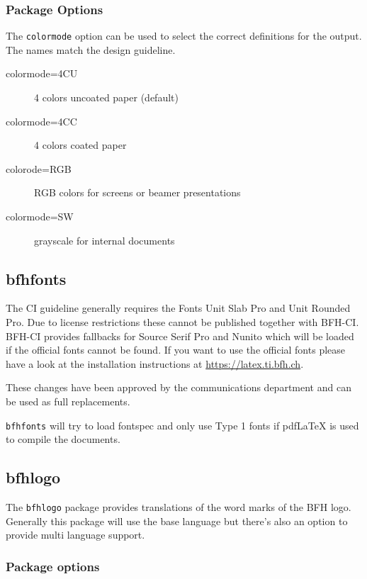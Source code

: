 \documentclass[
]{bfhpub}				%
\newcommand*{\pkg}[1]{\texttt{#1}}
\newcommand*{\opt}[1]{\texttt{#1}}
\begin{document}
\subsubsection{Package Options}

The \opt{colormode} option can be used to select the correct definitions for the output.
The names match the design guideline.

\begin{description}
	\item[colormode=4CU] 4 colors uncoated paper (default)
	\item[colormode=4CC] 4 colors coated paper
	\item[colorode=RGB] RGB colors for screens or beamer presentations
	\item[colormode=SW] grayscale for internal documents
\end{description}

\subsection{bfhfonts}

The CI guideline generally requires the Fonts Unit Slab Pro and Unit Rounded Pro.
Due to license restrictions these cannot be published together with BFH-CI.
BFH-CI provides fallbacks for Source Serif Pro and Nunito which will be loaded if the official fonts cannot be found.
If you want to use the official fonts please have a look at the installation instructions at  \url{https://latex.ti.bfh.ch}.

These changes have been approved by the communications department and can be used as full replacements.

\pkg{bfhfonts} will try to load fontspec and only use Type 1 fonts if pdf\LaTeX{} is used to compile the documents.

\subsection{bfhlogo}

The \pkg{bfhlogo} package provides translations of the word marks of the BFH logo.
Generally this package will use the base language but there's also an option to provide multi language support.

\subsubsection{Package options}
\end{document}
